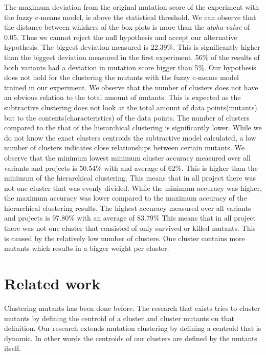 \documentclass[conference,draftclsnofoot,onecolumn]{IEEEtran}
\begin{document}
\newline
The maximum deviation from the original mutation score of the experiment with the fuzzy c-means model, is above the statistical threshold.
We can observe that the distance between whiskers of the box-plots is more than the \textit{alpha-value} of 0.05.
Thus we cannot reject the null hypothesis and accept our alternative hypothesis.
The biggest deviation measured is 22.39\%.
This is significantly higher than the biggest deviation measured in the first experiment.
56\% of the results of both variants had a deviation in mutation score bigger than 5\%.
Our hypothesis does not hold for the clustering the mutants with the fuzzy c-means model trained in our experiment.
\newline
We observe that the number of clusters does not have an obvious relation to the total amount of mutants. 
This is expected as the subtractive clustering does not look at the total amount of data points(mutants) but to the contents(characteristics) of the data points.
The number of clusters compared to the that of the hierarchical clustering is significantly lower.
While we do not know the exact clusters centroids the subtractive model calculated, a low number of clusters indicates close relationships between certain mutants.
\newline
We observe that the minimum lowest minimum cluster accuracy measured over all variants and projects is 50.54\% with and average of 62\%. 
This is higher than the minimum of the hierarchical clustering.
This means that in all project there was not one cluster that was evenly divided.
While the minimum accuracy was higher, the maximum accuracy was lower compared to the maximum accuracy of the hierarchical clustering results.
The highest accuracy measured over all variants and projects is 97.80\% with an average of 83.79\%
This means that in all project there was not one cluster that consisted of only survived or killed mutants.
This is caused by the relatively low number of clusters.
One cluster contains more mutants which results in a bigger weight per cluster.
\section{Related work}
\label{ch:related_work}
Clustering mutants has been done before.
The research that exists tries to cluster mutants by defining the centroid of a cluster and cluster mutants on that definition.
Our research extends mutation clustering by defining a centroid that is dynamic.
In other words the centroids of our clusters are defined by the mutants itself.
\end{document}
